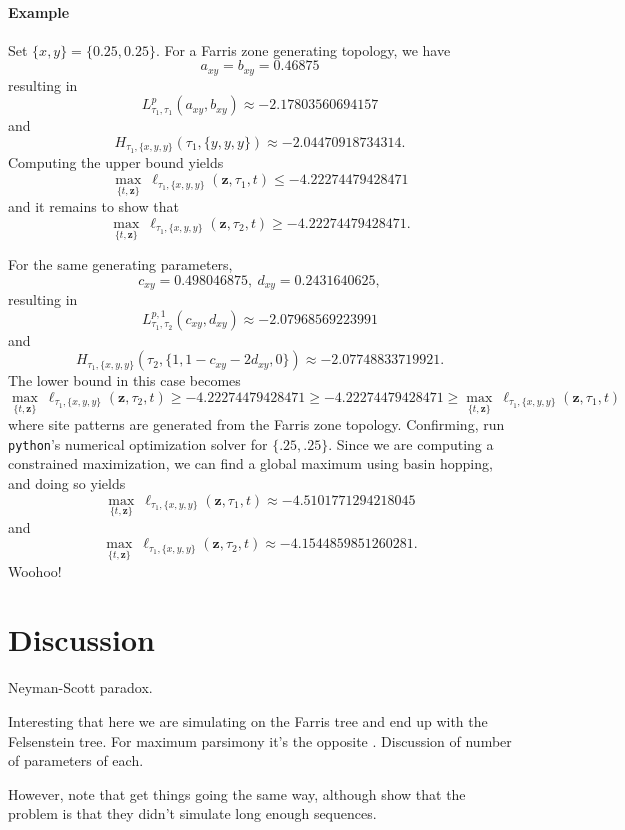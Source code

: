 \documentclass[a4paper]{article}
\newcommand{\fullAncestralStateCategories}{\mathbf{z}}
\begin{document}
\paragraph{Example}

Set $\{x, y\} = \{0.25, 0.25\}$.
For a Farris zone generating topology, we have
$$
a_{xy} = b_{xy} = 0.46875
$$
resulting in
$$
L^{p}_{\tau_1,\tau_1}(a_{xy},b_{xy}) \approx -2.17803560694157
$$
and
$$
H_{\tau_1,\{x,y,y\}}(\tau_1,\{y, y, y\})  \approx -2.04470918734314.
$$
Computing the upper bound yields
$$
\max_{\{t,\fullAncestralStateCategories\}} \ \ell_{\tau_1,\{x,y,y\}}(\fullAncestralStateCategories,\tau_1,t) \le -4.22274479428471
$$
and it remains to show that
$$
\max_{\{t,\fullAncestralStateCategories\}} \ \ell_{\tau_1,\{x,y,y\}}(\fullAncestralStateCategories,\tau_2,t) \ge -4.22274479428471.
$$

For the same generating parameters,
$$
c_{xy} = 0.498046875, \ d_{xy} = 0.2431640625,
$$
resulting in
$$
L^{p,1}_{\tau_1,\tau_2}(c_{xy},d_{xy}) \approx -2.07968569223991
$$
and
$$
H_{\tau_1,\{x,y,y\}}(\tau_2,\{1, 1-c_{xy}-2d_{xy}, 0\}) \approx -2.07748833719921.
$$
The lower bound in this case becomes
$$
\max_{\{t,\fullAncestralStateCategories\}} \ \ell_{\tau_1,\{x,y,y\}}(\fullAncestralStateCategories,\tau_2,t) \ge -4.22274479428471 \ge -4.22274479428471 \ge \max_{\{t,\fullAncestralStateCategories\}} \ \ell_{\tau_1,\{x,y,y\}}(\fullAncestralStateCategories,\tau_1,t)
$$
where site patterns are generated from the Farris zone topology.
Confirming, run \texttt{python}'s numerical optimization solver for $\{.25, .25\}$.
Since we are computing a constrained maximization, we can find a global maximum using basin hopping, and doing so yields
$$
\max_{\{t,\fullAncestralStateCategories\}} \ \ell_{\tau_1,\{x,y,y\}}(\fullAncestralStateCategories,\tau_1,t) \approx -4.5101771294218045
$$
and
$$
\max_{\{t,\fullAncestralStateCategories\}} \ \ell_{\tau_1,\{x,y,y\}}(\fullAncestralStateCategories,\tau_2,t) \approx -4.1544859851260281.
$$
Woohoo!

\section{Discussion}

Neyman-Scott paradox.

Interesting that here we are simulating on the Farris tree and end up with the Felsenstein tree.
For maximum parsimony it's the opposite \cite{Felsenstein1978-rr}.
Discussion of number of parameters of each.

However, note that \cite{Siddall1998-hq} get things going the same way, although \cite{Swofford2001-hr} show that the problem is that they didn't simulate long enough sequences.



\end{document}
